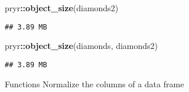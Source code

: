 \documentclass[
]{article}
\newenvironment{Shaded}{\begin{snugshade}}{\end{snugshade}}
\newcommand{\FunctionTok}[1]{\textcolor[rgb]{0.13,0.29,0.53}{\textbf{#1}}}
\newcommand{\NormalTok}[1]{#1}
\newcommand{\SpecialCharTok}[1]{\textcolor[rgb]{0.81,0.36,0.00}{\textbf{#1}}}
\begin{document}
\begin{Shaded}
\begin{Highlighting}[]
\NormalTok{pryr}\SpecialCharTok{::}\FunctionTok{object\_size}\NormalTok{(diamonds2)}
\end{Highlighting}
\end{Shaded}

\begin{verbatim}
## 3.89 MB
\end{verbatim}

\begin{Shaded}
\begin{Highlighting}[]
\NormalTok{pryr}\SpecialCharTok{::}\FunctionTok{object\_size}\NormalTok{(diamonds, diamonds2)}
\end{Highlighting}
\end{Shaded}

\begin{verbatim}
## 3.89 MB
\end{verbatim}

Functions Normalize the columns of a data frame
\end{document}
